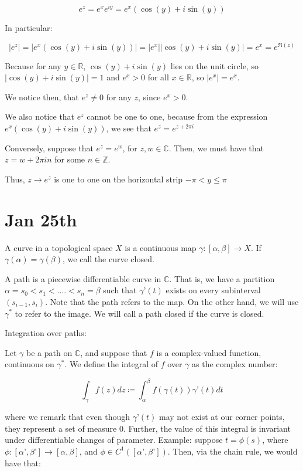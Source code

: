 \documentclass[10pt]{article}
\begin{document}
$$ e^z = e^x e^{iy} = e^x (\cos(y) + i \sin(y)) $$

In particular:

$$ |e^z| = | e^x (\cos(y) + i \sin(y)) | = |e^x| |\cos(y) + i \sin(y)| = e^x = e^{\Re(z)}$$

Because for any $y \in \mathbb{R}$,  $\cos(y) + i \sin(y)$ lies on the unit circle, so $|\cos(y) + i \sin(y)| = 1$ and $e^x > 0$ for all $x \in \mathbb{R}$, so $|e^x| = e^x$.

We notice then, that $e^z \not = 0$ for any $z$, since $e^x > 0$. 

We also notice that $e^z$ cannot be one to one, because from the expression $e^x (\cos(y) + i \sin(y)) $, we see that $e^{z} = e^{z + 2\pi i}$

Conversely, suppose that $e^z = e^w$, for $z,w \in \mathbb{C}$. Then, we must have that $z = w + 2\pi i n$ for some $n \in \mathbb{Z}$.

Thus, $z \to e^z$ is one to one on the horizontal strip $-\pi < y \leq \pi$

\section*{Jan 25th}

A curve in a topological space $X$ is a continuous map $\gamma: [\alpha,\beta] \to X$. If $\gamma(\alpha) = \gamma(\beta)$, we call the curve closed.

A path is a piecewise differentiable curve in $\mathbb{C}$. That is, we have a partition $\alpha = s_0 < s_1 <.... < s_n = \beta$ such that $\gamma’(t)$ exists on every subinterval $(s_{i-1}, s_i)$. Note that the path refers to the map. On the other hand, we will use $\gamma^*$ to refer to the image. We will call a path closed if the curve is closed.

Integration over paths:

Let $\gamma$ be a path on $\mathbb{C}$, and suppose that $f$ is a complex-valued function, continuous on $\gamma^*$. We define the integral of $f$ over $\gamma$ as the complex number:

$$ \int_\gamma f(z) dz \coloneqq \int_\alpha^\beta f(\gamma(t)) \gamma’(t) dt$$

where we remark that even though $\gamma’(t)$ may not exist at our corner points, they represent a set of measure 0. Further, the value of this integral is invariant under differentiable changes of parameter. Example: suppose $t = \phi(s)$, where $\phi: [\alpha’, \beta’] \to [\alpha, \beta]$, and $\phi \in C^1([\alpha’, \beta’])$. Then, via the chain rule, we would have that:
\end{document}
